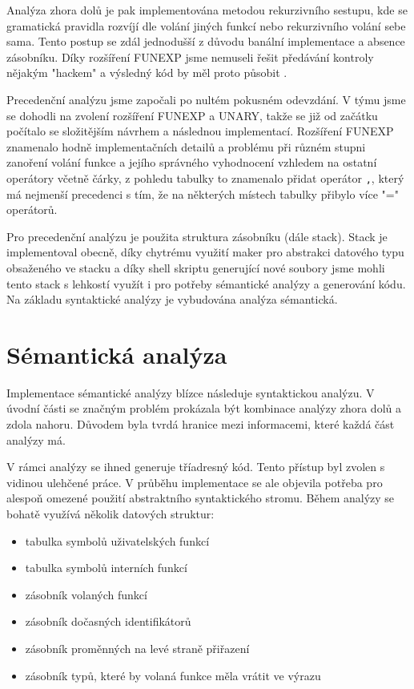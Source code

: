 \documentclass[12pt]{article}
\begin{document}
        Analýza zhora dolů je pak implementována metodou rekurzivního sestupu, kde se gramatická pravidla rozvíjí dle volání jiných funkcí nebo rekurzivního volání sebe sama. Tento postup se zdál jednodušší z důvodu banální implementace a absence zásobníku. Díky rozšíření FUNEXP jsme nemuseli řešit předávání kontroly nějakým "hackem" a výsledný kód by měl proto působit .

        Precedenční analýzu jsme započali po nultém pokusném odevzdání. V týmu jsme se dohodli na zvolení rozšíření FUNEXP a UNARY, takže se již od začátku počítalo se složitějším návrhem a následnou implementací. Rozšíření FUNEXP znamenalo hodně implementačních detailů a problému při různém stupni zanoření volání funkce a jejího správného vyhodnocení vzhledem na ostatní operátory včetně čárky, z pohledu tabulky to znamenalo přidat operátor \texttt{,}, který má nejmenší precedenci s tím, že na některých místech tabulky přibylo více "=" operátorů.
        
        Pro precedenční analýzu je použita struktura zásobníku (dále stack). Stack je implementoval obecně, díky chytrému využití maker pro abstrakci datového typu obsaženého ve stacku a díky shell skriptu generující nové soubory jsme mohli tento stack s lehkostí využít i pro potřeby sémantické analýzy a generování kódu.
        Na základu syntaktické analýzy je vybudována analýza sémantická.
        \newpage
    
    \section{Sémantická analýza}
        Implementace sémantické analýzy blízce následuje syntaktickou analýzu. V úvodní části se značným problém prokázala být kombinace analýzy zhora dolů a zdola nahoru. Důvodem byla tvrdá hranice mezi informacemi, které každá část analýzy má. 

        V rámci analýzy se ihned generuje tříadresný kód. Tento přístup byl zvolen s vidinou ulehčené práce. V průběhu implementace se ale objevila potřeba pro alespoň omezené použití abstraktního syntaktického stromu. Během analýzy se bohatě využívá několik datových struktur:

        \begin{itemize}
            \setlength\itemsep{0.05em}
            \item tabulka symbolů uživatelských funkcí
            \item tabulka symbolů interních funkcí
            \item zásobník volaných funkcí
            \item zásobník dočasných identifikátorů
            \item zásobník proměnných na levé straně přiřazení
            \item zásobník typů, které by volaná funkce měla vrátit ve výrazu
        \end{itemize}
\end{document}
